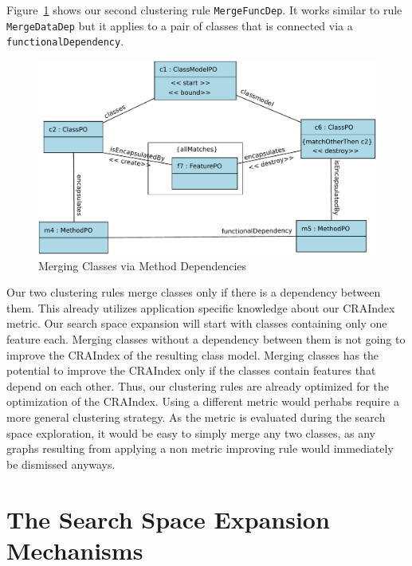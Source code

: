 \documentclass[submission,copyright,creativecommons]{eptcs}
\begin{document}
Figure~\ref{fig:MergeMethodRule} shows our second clustering rule \texttt{MergeFuncDep}. 
It works similar to rule \texttt{MergeDataDep} but it applies to a pair of classes that
is connected via a \texttt{functionalDependency}. 

\begin{figure}[ht] \centering
	\includegraphics[width=\linewidth]{images/RuleMergeMethodDep.pdf}
 \caption{Merging Classes via Method Dependencies}
 \label{fig:MergeMethodRule}
\end{figure}

Our two clustering rules merge classes only if there is a dependency between them. 
This already utilizes application specific knowledge about our CRAIndex metric. Our 
search space expansion will start with classes containing only one feature each. Merging 
classes without a dependency between them is not going to improve the CRAIndex of 
the resulting class model. Merging classes has the potential to improve the CRAIndex only 
if the classes contain features that depend on each other. Thus, our clustering rules 
are already optimized for the optimization of the CRAIndex. Using a different metric would 
perhabs require a more general clustering strategy. As the metric is evaluated 
during the search space exploration, it would be easy to simply merge any two 
classes, as any graphs resulting from applying a non metric improving rule 
would immediately be dismissed anyways.


\section{The Search Space Expansion Mechanisms}
\label{sec:expansion}
\end{document}
